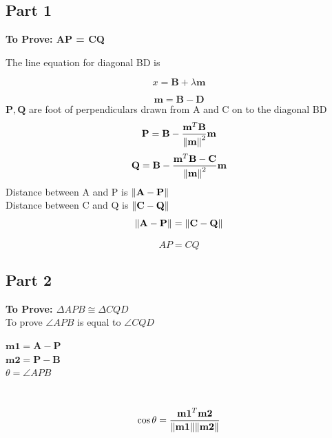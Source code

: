 \documentclass[10pt, a4paper]{article}
\let\vec\mathbf
\begin{document}
\subsection{Part 1}
	\textbf{To Prove: AP = CQ}

		
		The line equation for diagonal BD is
		\begin{center}
   		\begin{equation}
		x = \vec{B}+\lambda\vec{m}
		\end{equation}
		
		\begin{equation}
		\vec{m} = \vec{B}-\vec{D}
		\end{equation}
			$\vec{P} , \vec{Q}$ are foot of perpendiculars drawn from A and C on to the diagonal BD
		\begin{equation}
		\vec{P} = \vec{B} - \frac{\vec{m}^T \vec{B}}{\norm{\vec{m}}^2}\vec{m}
		\end{equation}
		\begin{equation}
		\vec{Q} = \vec{B} - \frac{\vec{m}^T \vec{B-C}}{\norm{\vec{m}}^2}\vec{m}
		\end{equation}
	Distance between A and P is
	$\norm{\vec{A-P}}$\\
	Distance between C and Q is 
	$\norm{\vec{C-Q}}$\\
	\begin{equation}
	\norm{\vec{A-P}} =  \norm{\vec{C-Q}}
	\end{equation}
		
		\begin{equation}
			AP = CQ
		\end{equation}
	\end{center}	
	\subsection{Part 2}
		\textbf{To Prove:  $\Delta APB \cong \Delta CQD$}\\
		To prove $\angle {APB}$ is equal to $\angle {CQD}$
	\begin{center}
	$\vec{m1} = \vec{A-P}$\\
	$\vec{m2} = \vec{P-B}$\\
	$\theta= \angle {APB}$ \\
	\end{center}\
	\\
		\begin {equation}
		\cos\theta = \frac{\vec{m1}^T \vec{m2}}{\norm{\vec{m1}}\norm{\vec{m2}}}
		\end {equation}
	
\end{document}
